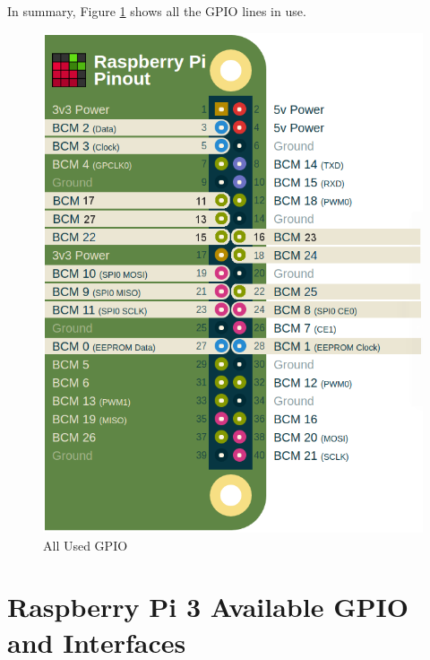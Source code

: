 \documentclass{article}
\begin{document}
In summary, Figure \ref{All_Used_GPIO} shows all the GPIO lines in use.


	\begin{figure}[H]
		\centering
		\includegraphics[scale=0.3]{pics/All_Used_GPIO.png}
		\caption{All Used GPIO}
		\label{All_Used_GPIO}
	\end{figure}

\section{Raspberry Pi 3 Available GPIO and Interfaces}







	
	







\end{document}
